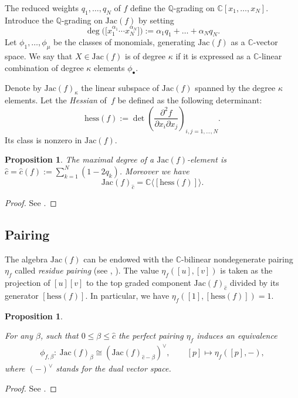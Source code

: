 \documentclass[pdftex]{sigma}
\numberwithin{equation}{section}
\newtheorem{Proposition}[Theorem]{Proposition}
 { \theoremstyle{definition}
\newtheorem{Definition}[Theorem]{Definition}
\newtheorem{Note}[Theorem]{Note}
\newtheorem{Example}[Theorem]{Example}
\newtheorem{Remark}[Theorem]{Remark} }
\newcommand{\CC}{{\mathbb{C}}}
\newcommand{\QQ}{{\mathbb{Q}}}
\newcommand{\Jac}{\mathrm{Jac}}
\newcommand{\hess}{\mathrm{hess}}
\begin{document}
The reduced weights $q_1,\dots,q_N$ of $f$ define the $\QQ$-grading on $\CC[x_1,\dots,x_N]$.
Introduce the $\QQ$-grading on $\Jac(f)$ by setting
\[
	\deg\bigl(\bigl[x_1^{\alpha_1}\cdots x_N^{\alpha_N}\bigr]\bigr) := \alpha_1q_1 + \dots + \alpha_Nq_N.
\]
Let $\phi_1,\dots,\phi_\mu$ be the classes of monomials, generating $\Jac(f)$ as a $\CC$-vector space.
We say that $X \in \Jac(f)$ is of degree $\kappa$ if it is expressed as a $\CC$-linear combination of degree $\kappa$ elements $\phi_\bullet$.

Denote by $\Jac(f)_\kappa$ the linear subspace of $\Jac(f)$ spanned by the degree $\kappa$ elements. Let the {\em Hessian} of~$f$ be defined as the following determinant:
\begin{equation*}
\hess(f):=\det \left(\frac{\partial^2 f}{\partial x_{i} \partial x_{j}}\right)_{i,j=1,\dots,N}.
\end{equation*}
Its class is nonzero in $\Jac(f)$.

\begin{Proposition}\label{prop: top degree}
	The maximal degree of a $\Jac(f)$-element is ${\widehat c}={\widehat c}(f) := \sum_{k=1}^N (1 - 2 q_k)$. Moreover we have
	\[
		\Jac(f)_{\widehat c} = \CC \langle [\hess(f)] \rangle.
	\]
\end{Proposition}
\begin{proof}
 See \cite[Section II]{AGV85}.
\end{proof}

\subsection{Pairing}
The algebra $\Jac(f)$ can be endowed with the $\CC$-bilinear nondegenerate pairing $\eta_f$ called \textit{residue pairing} (see \cite[Chapter~5]{GH94}, \cite[Section~5.11]{AGV85}).
The value $\eta_f([u],[v])$ is taken as the projection of $[u][v]$ to the top graded component $\Jac(f)_{\widehat c}$ divided by its generator $[\hess(f)]$. In particular, we have $\eta_f([1],[\hess(f)]) = 1$.

\begin{Proposition}\label{prop: grading of Jac(f)}

For any $\beta$, such that $0 \le \beta \le {\widehat c}$ the perfect pairing $\eta_f$ induces an equivalence
\begin{gather*}
\phi_{f,\beta}\colon\ \Jac(f)_{\beta} \cong (\Jac(f)_{{\widehat c} - \beta})^\vee,\qquad
[p]\mapsto \eta_f([p],-),
\end{gather*}
where $(-)^\vee$ stands for the dual vector space.
\end{Proposition}
\begin{proof}
 See \cite[Section II]{AGV85}.
\end{proof}
\end{document}
